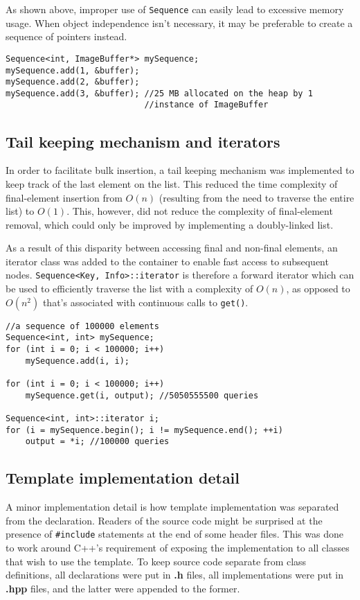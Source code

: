 ﻿\documentclass{article}
\begin{document}
As shown above, improper use of {\tt Sequence} can easily lead to excessive
memory usage. When object independence isn't necessary, it may be preferable
to create a sequence of pointers instead.

\begin{verbatim}
Sequence<int, ImageBuffer*> mySequence;
mySequence.add(1, &buffer);
mySequence.add(2, &buffer);
mySequence.add(3, &buffer); //25 MB allocated on the heap by 1
                            //instance of ImageBuffer
\end{verbatim}

\subsection{Tail keeping mechanism and iterators}

In order to facilitate bulk insertion, a tail keeping mechanism was implemented
to keep track of the last element on the list. This reduced the time complexity
of final-element insertion from $O(n)$ (resulting from the need to traverse the
entire list) to $O(1)$. This, however, did not reduce the complexity of
final-element removal, which could only be improved by implementing a doubly-linked
list.

As a result of this disparity between accessing final and non-final elements,
an iterator class was added to the container to enable fast access to subsequent
nodes. {\tt Sequence<Key, Info>::iterator} is therefore a forward iterator
which can be used to efficiently traverse the list with a complexity of $O(n)$,
as opposed to $O(n^2)$ that's associated with continuous calls to {\tt get()}.

\begin{verbatim}
//a sequence of 100000 elements
Sequence<int, int> mySequence;
for (int i = 0; i < 100000; i++)
    mySequence.add(i, i);

for (int i = 0; i < 100000; i++)
    mySequence.get(i, output); //5050555500 queries

Sequence<int, int>::iterator i;
for (i = mySequence.begin(); i != mySequence.end(); ++i)
    output = *i; //100000 queries
\end{verbatim}

\subsection{Template implementation detail}

A minor implementation detail is how template implementation was separated from
the declaration. Readers of the source code might be surprised at the presence
of {\tt \#include} statements at the end of some header files. This was done to work
around C++'s requirement of exposing the implementation to all classes that wish to
use the template. To keep source code separate from class definitions, all declarations
were put in {\bf .h} files, all implementations were put in {\bf .hpp} files, and the
latter were appended to the former.
\end{document}
